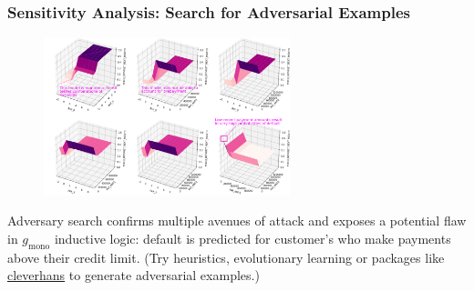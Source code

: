\documentclass[11pt,
               aspectratio=169,
               hyperref={colorlinks}
               ]{beamer}
\begin{document}
			\begin{frame}[t, allowframebreaks]
				\vspace{-10pt}
				\frametitle{\textbf{Sensitivity Analysis}: Search for Adversarial Examples}
				\begin{figure}
					\begin{center}
						\includegraphics[height=130pt]{img/sa_max_prob.png}
					\end{center}
				\end{figure}
			
				\tiny{Adversary search confirms multiple avenues of attack and exposes a potential flaw in $g_{\text{mono}}$ inductive logic: default is predicted for customer's who make payments above their credit limit. (Try heuristics, evolutionary learning or packages like \href{https://github.com/tensorflow/cleverhans}{cleverhans} to generate adversarial examples.)}
					
		
			\end{frame}			
			
\end{document}
